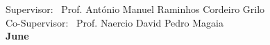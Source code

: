 \begin{titlepage}
\begin{center}
{\large Supervisor: \ Prof. António Manuel Raminhos Cordeiro Grilo}\\
{\large Co-Supervisor: \ Prof. Naercio David Pedro Magaia}\\[2cm]

{\Large \textbf{June}}\\
\end{center}
\end{titlepage}